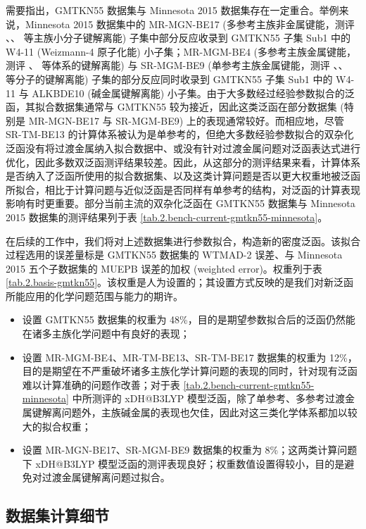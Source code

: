 需要指出，GMTKN55 数据集与 Minnesota 2015 数据集存在一定重合。举例来说，Minnesota 2015 数据集中的 MR-MGN-BE17 (多参考主族非金属键能，测评 、、 等主族小分子键解离能) 子集中部分反应收录到 GMTKN55 子集 Sub1 中的 W4-11 (Weizmann-4 原子化能) 小子集；MR-MGM-BE4 (多参考主族金属键能，测评 、 等体系的键解离能) 与 SR-MGM-BE9 (单参考主族金属键能，测评 、、 等分子的键解离能) 子集的部分反应同时收录到 GMTKN55 子集 Sub1 中的 W4-11 与 ALKBDE10 (碱金属键解离能) 小子集。由于大多数经过经验参数拟合的泛函，其拟合数据集通常与 GMTKN55 较为接近，因此这类泛函在部分数据集 (特别是 MR-MGN-BE17 与 SR-MGM-BE9) 上的表现通常较好。而相应地，尽管 SR-TM-BE13 的计算体系被认为是单参考的，但绝大多数经验参数拟合的双杂化泛函没有将过渡金属纳入拟合数据中、或没有针对过渡金属问题对泛函表达式进行优化，因此多数双泛函测评结果较差。因此，从这部分的测评结果来看，计算体系是否纳入了泛函所使用的拟合数据集、以及这类计算问题是否以更大权重地被泛函所拟合，相比于计算问题与近似泛函是否同样有单参考的结构，对泛函的计算表现影响有时更重要。部分当前主流的双杂化泛函在 GMTKN55 数据集与 Minnesota 2015 数据集的测评结果列于表 \ref{tab.2.bench-current-gmtkn55-minnesota}。

在后续的工作中，我们将对上述数据集进行参数拟合，构造新的密度泛函。该拟合过程选用的误差量标是 GMTKN55 数据集的 WTMAD-2 误差、与 Minnesota 2015 五个子数据集的 MUEPB 误差的加权 (weighted error)。权重列于表 \ref{tab.2.basis-gmtkn55}。该权重是人为设置的；其设置方式反映的是我们对新泛函所能应用的化学问题范围与能力的期许。
\begin{itemize}[nosep]
  \item 设置 GMTKN55 数据集的权重为 48\%，目的是期望参数拟合后的泛函仍然能在诸多主族化学问题中有良好的表现；
  \item 设置 MR-MGM-BE4、MR-TM-BE13、SR-TM-BE17 数据集的权重为 12\%，目的是期望在不严重破坏诸多主族化学计算问题的表现的同时，针对现有泛函难以计算准确的问题作改善；对于表 \ref{tab.2.bench-current-gmtkn55-minnesota} 中所测评的 xDH@B3LYP 模型泛函，除了单参考、多参考过渡金属键解离问题外，主族碱金属的表现也欠佳，因此对这三类化学体系都加以较大的拟合权重；
  \item 设置 MR-MGN-BE17、SR-MGM-BE9 数据集的权重为 8\%；这两类计算问题下 xDH@B3LYP 模型泛函的测评表现良好；权重数值设置得较小，目的是避免对过渡金属键解离问题过拟合。
\end{itemize}

\subsection{数据集计算细节}

